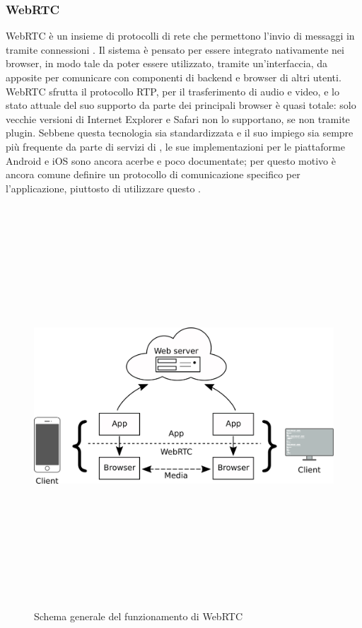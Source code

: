 		\subsubsection{WebRTC}
			WebRTC è un insieme di protocolli di rete che permettono l'invio di messaggi in  tramite connessioni . Il sistema è pensato per essere integrato nativamente nei browser, in modo tale da poter essere utilizzato, tramite un'interfaccia, da  apposite per comunicare con componenti di backend e browser di altri utenti. WebRTC sfrutta il protocollo \gls{RTP}, per il trasferimento di audio e video, e lo stato attuale del suo supporto da parte dei principali browser è quasi totale: solo vecchie versioni di Internet Explorer e Safari non lo supportano, se non tramite plugin. Sebbene questa tecnologia sia standardizzata e il suo impiego sia sempre più frequente da parte di servizi di , le sue implementazioni per le piattaforme Android e iOS sono ancora acerbe e poco documentate; per questo motivo è ancora comune definire un protocollo di comunicazione specifico per l'applicazione, piuttosto di utilizzare questo .
			\begin{figure}[H]
				\begin{center}
					\includegraphics[width=16.5cm,height=15cm,keepaspectratio]{immagini/webrtc-schema}
					\caption{Schema generale del funzionamento di WebRTC}
				\end{center}
			\end{figure}

